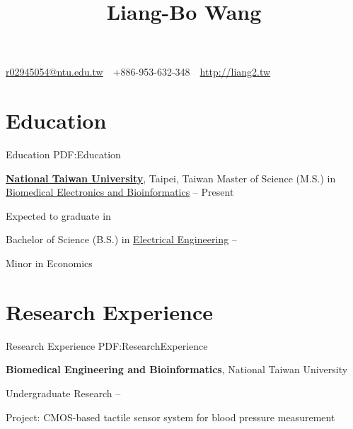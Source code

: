\documentclass[a4paper,10pt,oneside]{article}
\begin{document}

\title{Liang-Bo Wang}

\begin{subtitle}
\href{mailto:r02945054@ntu.edu.tw}
{r02945054@ntu.edu.tw}
\,\BulletSymbol\,
+886-953-632-348
\,\BulletSymbol\,
\href{http://liang2.tw}
{http://liang2.tw}
\end{subtitle}

\begin{body}


\section
{Education}
{Education}
{PDF:Education}

\href{http://www.ntu.edu.tw/english/index.html}
{\textbf{National Taiwan University}},
Taipei, Taiwan
\EntryGapNoBreak
Master of Science (M.S.) in
\href{http://www.bebi.ntu.edu.tw/English/index.html}
{Biomedical Electronics and Bioinformatics}
\hfill
{} -- Present
\begin{detail}
\BulletItem
Expected to graduate in 
\end{detail}

\EntryGapNoBreak
Bachelor of Science (B.S.) in
\href{http://www.ee.ntu.edu.tw/en/}
{Electrical Engineering}
\hfill
{} --
\begin{detail}
\BulletItem
Minor in Economics
\end{detail}


\section
{Research Experience}
{Research Experience}
{PDF:ResearchExperience}

\textbf{Biomedical Engineering and Bioinformatics},
National Taiwan University
\par
Undergraduate Research
\hfill
{} --
\begin{detail}
\BulletItem
Project: CMOS-based tactile sensor system for blood pressure measurement
\end{detail}


\end{body}
\end{document}

